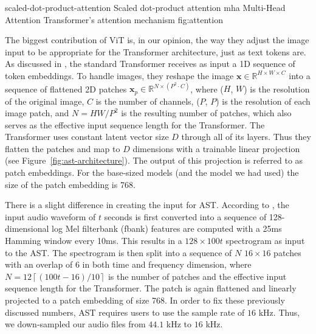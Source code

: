 \asideimagesnocite{2.5cm}{4.6cm}
	    {scaled-dot-product-attention}
	    {Scaled dot-product attention \cite{kolesnikov2021image}}
	    {mha}
	    {Multi-Head Attention \cite{gong2021ast}}
	    {Transformer's attention mechanism}
	    {fig:attention}

The biggest contribution of ViT is, in our opinion, the way they adjust the image input to be appropriate for the Transformer architecture, just as text tokens are. 
As discussed in \cite{kolesnikov2021image}, the standard Transformer receives as input a 1D sequence of token embeddings. To handle images, they reshape the image $\mathbf{x} \in \mathbb{R}^{H \times W \times C}$ into a sequence of flattened 2D patches $\mathbf{x}_p \in \mathbb{R}^{N \times (P^2 \cdot C)}$, where ($H$, $W$) is the resolution of the original image, $C$ is the number of channels, ($P$, $P$) is the resolution of each image patch, and $N = HW / P^2$ is the resulting number of patches, which also serves as the effective input sequence length for the Transformer. The Transformer uses constant latent vector size $D$ through all of its layers. Thus they flatten the patches and map to $D$ dimensions with a trainable linear projection (see Figure~\ref{fig:ast-architecture}). The output of this projection is referred to as patch embeddings. For the base-sized models (and the model we had used) the size of the patch embedding is 768.

There is a slight difference in creating the input for AST. According to \cite{gong2021ast}, the input audio waveform of $t$
seconds is first converted into a sequence of 128-dimensional log
Mel filterbank (fbank) features are computed with a 25ms Hamming window every 10ms. This results in a $128 \times 100t$ spectrogram as input to the AST. The spectrogram is then split into a sequence of $N$ $16 \times 16$ patches with an overlap of 6 in both time
and frequency dimension, where $N = 12 \left\lceil (100t - 16)/10 \right\rceil$ is
the number of patches and the effective input sequence length for the Transformer. The patch is again flattened and linearly projected to a patch embedding of size 768. In order to fix these previously discussed numbers, AST requires users to use the sample rate of $16$ kHz. Thus, we down-sampled our audio files from $44.1$ kHz to $16$ kHz.

